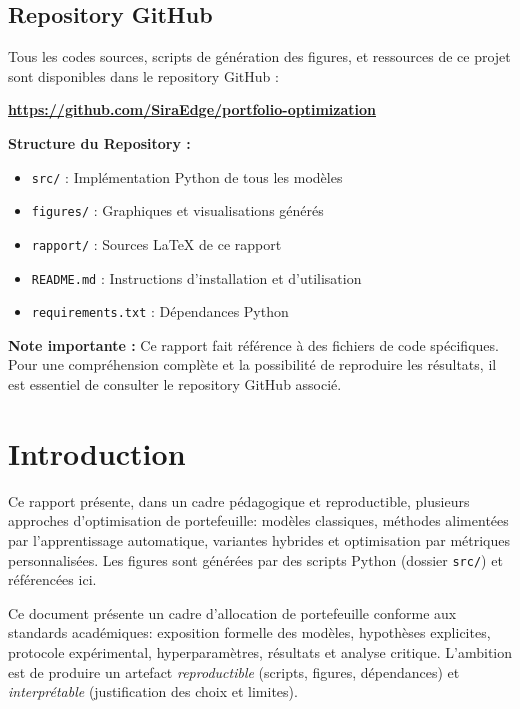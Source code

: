 \documentclass[11pt,a4paper]{article}
\begin{document}
\subsection*{Repository GitHub}
Tous les codes sources, scripts de génération des figures, et ressources de ce projet sont disponibles dans le repository GitHub :
\begin{center}
\textbf{\url{https://github.com/SiraEdge/portfolio-optimization}}
\end{center}

\textbf{Structure du Repository :}
\begin{itemize}
    \item \texttt{src/} : Implémentation Python de tous les modèles
    \item \texttt{figures/} : Graphiques et visualisations générés
    \item \texttt{rapport/} : Sources LaTeX de ce rapport
    \item \texttt{README.md} : Instructions d'installation et d'utilisation
    \item \texttt{requirements.txt} : Dépendances Python
\end{itemize}

\textbf{Note importante :} Ce rapport fait référence à des fichiers de code spécifiques. Pour une compréhension complète et la possibilité de reproduire les résultats, il est essentiel de consulter le repository GitHub associé.

\newpage

\tableofcontents

\newpage

\section{Introduction}
Ce rapport présente, dans un cadre pédagogique et reproductible, plusieurs approches d'optimisation de portefeuille: modèles classiques, méthodes alimentées par l'apprentissage automatique, variantes hybrides et optimisation par métriques personnalisées. Les figures sont générées par des scripts Python (dossier \texttt{src/}) et référencées ici.

\begin{tcolorbox}[title=Contexte et objectifs de recherche]
Ce document présente un cadre d'allocation de portefeuille conforme aux standards académiques: exposition formelle des modèles, hypothèses explicites, protocole expérimental, hyperparamètres, résultats et analyse critique. L'ambition est de produire un artefact \emph{reproductible} (scripts, figures, dépendances) et \emph{interprétable} (justification des choix et limites).
\end{tcolorbox}
\end{document}
